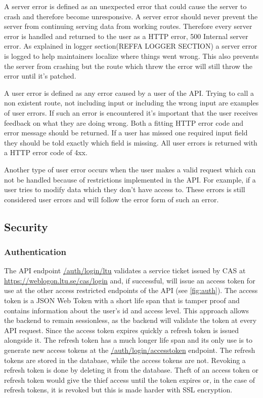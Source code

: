A server error is defined as an unexpected error that could cause the server to crash and therefore become unresponsive. A server error should never prevent the server from continuing serving data from working routes. Therefore every server error is handled and returned to the user as a HTTP error, 500 Internal server error. As explained in logger section(REFFA LOGGER SECTION) a server error is logged to help maintainers localize where things went wrong. This also prevents the server from crashing but the route which threw the error will still throw the error until it's patched.

A user error is defined as any error caused by a user of the API. Trying to call a non existent route, not including input or including the wrong input are examples of user errors. If such an error is encountered it's important that the user receives feedback on what they are doing wrong. Both a fitting HTTP error code and error message should be returned. If a user has missed one required input field they should be told exactly which field is missing. All user errors is returned with a HTTP error code of 4xx.

Another type of user error occurs when the user makes a valid request which can not be handled because of restrictions implemented in the API. For example, if a user tries to modify data which they don't have access to. These errors is still considered user errors and will follow the error form of such an error.

\subsection{Security}

\subsubsection{Authentication}
The API endpoint \url{/auth/login/ltu} validates a service ticket issued by CAS at \url{https://weblogon.ltu.se/cas/login} and, if successful, will issue an access token for use at the other access restricted endpoints of the API (see \ref{fig:auth}). The access token is a JSON Web Token with a short life span that is tamper proof and contains information about the user's id and access level. This approach allows the backend to remain sessionless, as the backend will validate the token at every API request. Since the access token expires quickly a refresh token is issued alongside it. The refresh token has a much longer life span and its only use is to generate new access tokens at the \url{/auth/login/accesstoken} endpoint. The refresh tokens are stored in the database, while the access tokens are not. Revoking a refresh token is done by deleting it from the database. Theft of an access token or refresh token would give the thief access until the token expires or, in the case of refresh tokens, it is revoked but this is made harder with SSL encryption.

